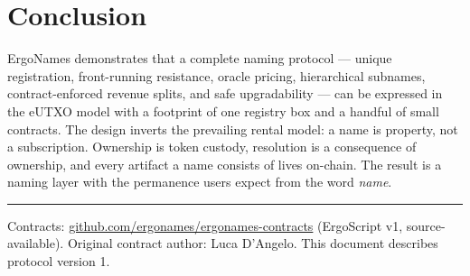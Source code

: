 \documentclass[11pt]{article}
\begin{document}
\section{Conclusion}

ErgoNames demonstrates that a complete naming protocol --- unique
registration, front-running resistance, oracle pricing, hierarchical
subnames, contract-enforced revenue splits, and safe upgradability --- can be
expressed in the eUTXO model with a footprint of one registry box and a
handful of small contracts. The design inverts the prevailing rental model: a
name is property, not a subscription. Ownership is token custody, resolution
is a consequence of ownership, and every artifact a name consists of lives
on-chain. The result is a naming layer with the permanence users expect from
the word \emph{name}.

\vspace{1cm}
\noindent\rule{\textwidth}{0.4pt}
\vspace{0.2cm}

\noindent\small
Contracts:
\href{https://github.com/ergonames/ergonames-contracts}{github.com/ergonames/ergonames-contracts}
(ErgoScript v1, source-available). Original contract author: Luca D'Angelo.
This document describes protocol version 1.
\end{document}
